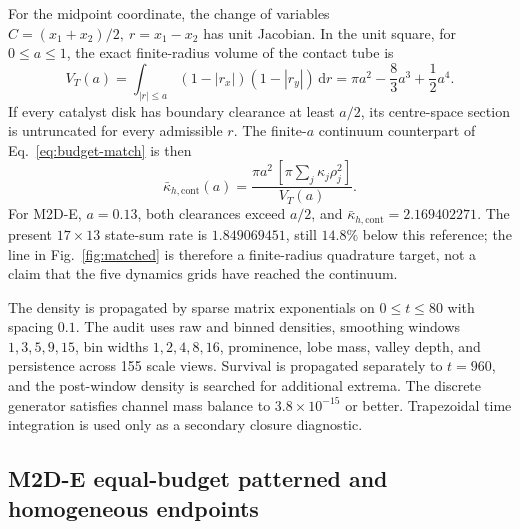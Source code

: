 \documentclass[aps,pre,reprint,amsmath,amssymb,longbibliography,floatfix]{revtex4-2}
\newcommand{\dd}{\mathrm d}
\begin{document}
For the midpoint coordinate, the change of variables
\(C=(x_1+x_2)/2,\ r=x_1-x_2\) has unit Jacobian.  In the unit square, for
\(0\leq a\leq1\), the exact finite-radius volume of the contact tube is
\begin{equation}
V_T(a)=\int_{|r|\leq a}(1-|r_x|)(1-|r_y|)\,\dd r
=\pi a^2-\frac{8}{3}a^3+\frac12a^4.
\label{eq:finite-a-tube-volume}
\end{equation}
If every catalyst disk has boundary clearance at least \(a/2\), its
centre-space section is untruncated for every admissible \(r\).  The
finite-\(a\) continuum counterpart of Eq.~\eqref{eq:budget-match} is then
\begin{equation}
\bar\kappa_{h,\mathrm{cont}}(a)
=\frac{\pi a^2\,[\pi\sum_j\kappa_j\rho_j^2]}{V_T(a)}.
\label{eq:finite-a-budget-match}
\end{equation}
For M2D-E, \(a=0.13\), both clearances exceed \(a/2\), and
\(\bar\kappa_{h,\mathrm{cont}}=2.169402271\).  The present \(17\times13\)
state-sum rate is \(1.849069451\), still \(14.8\%\) below this reference;
the line in Fig.~\ref{fig:matched} is therefore a finite-radius quadrature
target, not a claim that the five dynamics grids have reached the continuum.

The density is propagated by sparse matrix exponentials on
\(0\leq t\leq80\) with spacing \(0.1\). The audit uses raw and binned
densities, smoothing windows \(1,3,5,9,15\), bin widths
\(1,2,4,8,16\), prominence, lobe mass, valley depth, and persistence across
155 scale views. Survival is propagated separately to \(t=960\), and the
post-window density is searched for additional extrema. The discrete
generator satisfies channel mass balance to \(3.8\times10^{-15}\) or better.
Trapezoidal time integration is used only as a secondary closure diagnostic.

\subsection{M2D-E equal-budget patterned and homogeneous endpoints}
\label{sec:matched-control}
\end{document}
